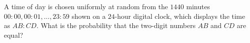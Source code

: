 A time of day is chosen uniformly at random from the $1440$ minutes $00{:}00,00{:}01,\dots,23{:}59$ shown on a $24$-hour digital clock, which displays the time as $AB{:}CD$. What is the probability that the two-digit numbers $AB$ and $CD$ are equal?
